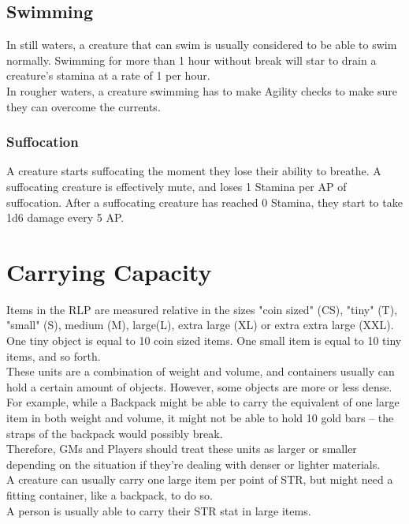 \subsection{Swimming}\label{subsec:swimming}
In still waters, a creature that can swim is usually considered to be able to swim normally.
Swimming for more than 1 hour without break will star to drain a creature's stamina at a rate of 1 per hour.\\
In rougher waters, a creature swimming has to make Agility checks to make sure they can overcome the currents.\\

\subsubsection{Suffocation}\label{subsubsec:suffocation}
A creature starts suffocating the moment they lose their ability to breathe.
A suffocating creature is effectively mute, and loses 1 Stamina per AP of suffocation.
After a suffocating creature has reached 0 Stamina, they start to take 1d6 damage every 5 AP.

\section{Carrying Capacity}\label{sec:carryingCapacity}
Items in the RLP are measured relative in the sizes "coin sized" (CS), "tiny" (T), "small" (S), medium (M), large(L), extra large (XL) or extra extra large (XXL).\\
One tiny object is equal to 10 coin sized items.
One small item is equal to 10 tiny items, and so forth.\\
These units are a combination of weight and volume, and containers usually can hold a certain amount of objects.
However, some objects are more or less dense.
For example, while a Backpack might be able to carry the equivalent of one large item in both weight and volume, it might not be able to hold 10 gold bars -- the straps of the backpack would possibly break.\\
Therefore, GMs and Players should treat these units as larger or smaller depending on the situation if they're dealing with denser or lighter materials.\\
A creature can usually carry one large item per point of STR, but might need a fitting container, like a backpack, to do so.\\

A person is usually able to carry their STR stat in large items.\\

